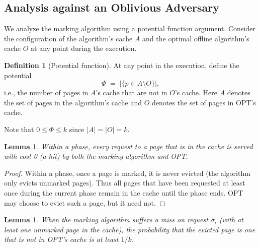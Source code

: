 \documentclass[twoside,12pt]{book}
\theoremstyle{plain}
\newtheorem{lemma}[theorem]{Lemma}
\theoremstyle{definition}
\newtheorem{definition}[theorem]{Definition}
\theoremstyle{remark}
\begin{document}
\subsection{Analysis against an Oblivious Adversary}

We analyze the marking algorithm using a potential function argument.
Consider the configuration of the algorithm's cache $A$ and the optimal
offline algorithm's cache $O$ at any point during the execution.

\begin{definition}[Potential function]\label{def:paging-potential}
At any point in the execution, define the potential
\[
  \Phi \;=\; \bigl|\{p \in A \setminus O\}\bigr|,
\]
i.e., the number of pages in $A$'s cache that are not in $O$'s cache.
Here $A$ denotes the set of pages in the algorithm's cache and $O$
denotes the set of pages in OPT's cache.
\end{definition}

Note that $0 \le \Phi \le k$ since $|A| = |O| = k$.

\begin{lemma}\label{lem:marking-hit}
Within a phase, every request to a page that is in the cache is served
with cost 0 (a hit) by both the marking algorithm and OPT.
\end{lemma}

\begin{proof}
Within a phase, once a page is marked, it is never evicted (the algorithm
only evicts unmarked pages).  Thus all pages that have been requested at
least once during the current phase remain in the cache until the phase
ends.  OPT may choose to evict such a page, but it need not.
\end{proof}

\begin{lemma}\label{lem:marking-miss-prob}
When the marking algorithm suffers a miss on request $\sigma_i$ (with at
least one unmarked page in the cache), the probability that the
evicted page is one that is not in OPT's cache is at least $1/k$.
\end{lemma}
\end{document}
